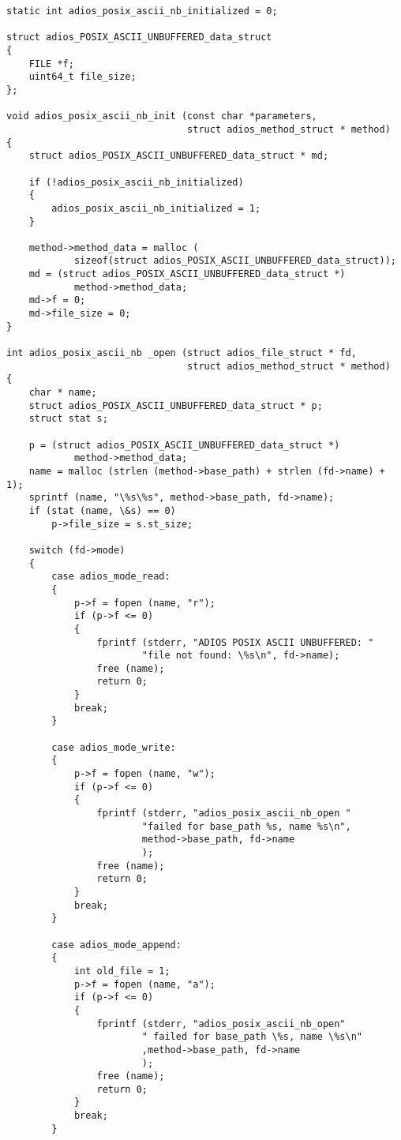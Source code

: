 \begin{lstlisting}[emph={ADIOS_METHOD_POSIX_ASCII_NB}, emphstyle={\color{red}\large\bf},
                   caption={Example: add unbuffered POSIX method, C source of write method}]
static int adios_posix_ascii_nb_initialized = 0;

struct adios_POSIX_ASCII_UNBUFFERED_data_struct
{
    FILE *f;
    uint64_t file_size;
};

void adios_posix_ascii_nb_init (const char *parameters, 
                                struct adios_method_struct * method)
{
    struct adios_POSIX_ASCII_UNBUFFERED_data_struct * md;

    if (!adios_posix_ascii_nb_initialized)
    {
        adios_posix_ascii_nb_initialized = 1;
    }

    method->method_data = malloc (
            sizeof(struct adios_POSIX_ASCII_UNBUFFERED_data_struct));
    md = (struct adios_POSIX_ASCII_UNBUFFERED_data_struct *) 
            method->method_data;
    md->f = 0;
    md->file_size = 0;
}

int adios_posix_ascii_nb _open (struct adios_file_struct * fd, 
                                struct adios_method_struct * method)
{
    char * name;
    struct adios_POSIX_ASCII_UNBUFFERED_data_struct * p;
    struct stat s;

    p = (struct adios_POSIX_ASCII_UNBUFFERED_data_struct *) 
            method->method_data;
    name = malloc (strlen (method->base_path) + strlen (fd->name) + 1);
    sprintf (name, "\%s\%s", method->base_path, fd->name);
    if (stat (name, \&s) == 0)
        p->file_size = s.st_size;

    switch (fd->mode)
    {
        case adios_mode_read:
        {
            p->f = fopen (name, "r");
            if (p->f <= 0)
            {
                fprintf (stderr, "ADIOS POSIX ASCII UNBUFFERED: "
                        "file not found: \%s\n", fd->name);
                free (name);
                return 0;
            }
            break;
        }

        case adios_mode_write:
        {
            p->f = fopen (name, "w");
            if (p->f <= 0)
            {
                fprintf (stderr, "adios_posix_ascii_nb_open " 
                        "failed for base_path %s, name %s\n", 
                        method->base_path, fd->name 
                        );
                free (name);
                return 0;
            }
            break;
        } 

        case adios_mode_append:
        {
            int old_file = 1;
            p->f = fopen (name, "a");
            if (p->f <= 0)
            {
                fprintf (stderr, "adios_posix_ascii_nb_open"
                        " failed for base_path \%s, name \%s\n"
                        ,method->base_path, fd->name
                        );
                free (name);
                return 0;
            }
            break;
        }


\end{lstlisting}
